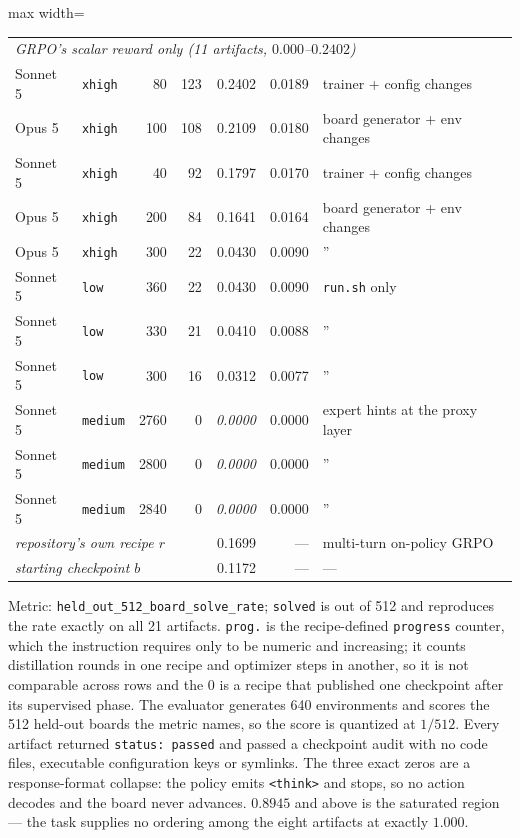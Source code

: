 \begin{table}[t]
\begin{adjustbox}{max width=\linewidth}
\begin{tabular}{llrrrrl}
\midrule
\multicolumn{7}{l}{\emph{GRPO's scalar reward only (11 artifacts, $0.000$--$0.2402$)}} \\
Sonnet 5 & \texttt{xhigh}  &    80 & 123 & 0.2402 & 0.0189 & trainer + config changes \\
Opus 5   & \texttt{xhigh}  &   100 & 108 & 0.2109 & 0.0180 & board generator + env changes \\
Sonnet 5 & \texttt{xhigh}  &    40 &  92 & 0.1797 & 0.0170 & trainer + config changes \\
Opus 5   & \texttt{xhigh}  &   200 &  84 & 0.1641 & 0.0164 & board generator + env changes \\
Opus 5   & \texttt{xhigh}  &   300 &  22 & 0.0430 & 0.0090 & \quad'' \\
Sonnet 5 & \texttt{low}    &   360 &  22 & 0.0430 & 0.0090 & \texttt{run.sh} only \\
Sonnet 5 & \texttt{low}    &   330 &  21 & 0.0410 & 0.0088 & \quad'' \\
Sonnet 5 & \texttt{low}    &   300 &  16 & 0.0312 & 0.0077 & \quad'' \\
Sonnet 5 & \texttt{medium} &  2760 &   0 & \emph{0.0000} & 0.0000 & expert hints at the proxy layer \\
Sonnet 5 & \texttt{medium} &  2800 &   0 & \emph{0.0000} & 0.0000 & \quad'' \\
Sonnet 5 & \texttt{medium} &  2840 &   0 & \emph{0.0000} & 0.0000 & \quad'' \\
\midrule
\multicolumn{4}{l}{\emph{repository's own recipe $r$}} & 0.1699 & --- & multi-turn on-policy GRPO \\
\multicolumn{4}{l}{\emph{starting checkpoint $b$}}    & 0.1172 & --- & --- \\
\bottomrule
\end{tabular}
\end{adjustbox}
\par\vspace{2pt}
{\footnotesize Metric: \texttt{held\_out\_512\_board\_solve\_rate}; \texttt{solved} is out of 512
and reproduces the rate exactly on all 21 artifacts. \texttt{prog.} is the recipe-defined
\texttt{progress} counter, which the instruction requires only to be numeric and increasing;
it counts distillation rounds in one recipe and optimizer steps in another, so it is not
comparable across rows and the $0$ is a recipe that published one checkpoint after its
supervised phase. The evaluator generates 640 environments and scores the 512 held-out boards
the metric names, so the score is quantized at $1/512$. Every artifact returned
\texttt{status: passed} and passed a checkpoint audit with no code files, executable
configuration keys or symlinks. The three exact zeros are a response-format collapse: the
policy emits \texttt{<think>} and stops, so no action decodes and the board never advances.
$0.8945$ and above is the saturated region --- the task supplies no ordering among the eight
artifacts at exactly $1.000$.}
\end{table}
